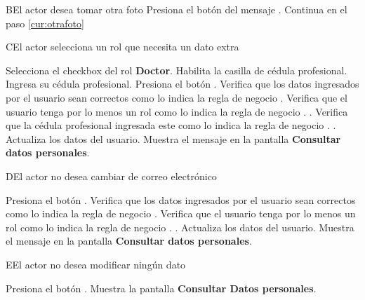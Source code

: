 \begin{UCtrayectoriaA}{B}{El actor desea tomar otra foto}
	\UCpaso [\UCactor] Presiona el botón  del mensaje .
	\UCpaso Continua en el paso \ref{cur:otrafoto}
\end{UCtrayectoriaA}


\begin{UCtrayectoriaA}{C}{El actor selecciona un rol que necesita un dato extra}
	
	\UCpaso [\UCactor] Selecciona el checkbox del rol \textbf{Doctor}.
	\UCpaso Habilita la casilla de cédula profesional.
	\UCpaso [\UCactor] Ingresa su cédula profesional. \label{Cedula}
	\UCpaso [\UCactor] Presiona el botón .
	\UCpaso Verifica que los datos ingresados por el usuario sean correctos como lo indica la regla de negocio . 
	\UCpaso Verifica que el usuario tenga por lo menos un rol como lo indica la regla de negocio . .
	\UCpaso Verifica que la cédula profesional ingresada este como lo indica la regla de negocio . .
	\UCpaso Actualiza los datos del usuario.
	\UCpaso Muestra el mensaje  en la pantalla \textbf{Consultar datos personales}.
\end{UCtrayectoriaA}


\begin{UCtrayectoriaA}{D}{El actor no desea cambiar de correo electrónico}
	
	\UCpaso [\UCactor] Presiona el botón .
	\UCpaso Verifica que los datos ingresados por el usuario sean correctos como lo indica la regla de negocio . 
	\UCpaso Verifica que el usuario tenga por lo menos un rol como lo indica la regla de negocio . .
	\UCpaso Actualiza los datos del usuario.
	\UCpaso Muestra el mensaje  en la pantalla \textbf{Consultar datos personales}.
\end{UCtrayectoriaA}



\begin{UCtrayectoriaA}{E}{El actor no desea modificar ningún dato}
		
	\UCpaso [\UCactor] Presiona el botón .
	\UCpaso Muestra la pantalla \textbf{Consultar Datos personales}.

\end{UCtrayectoriaA}

